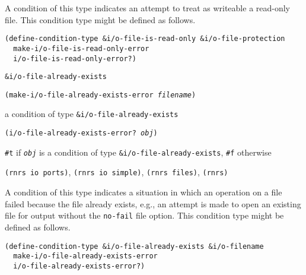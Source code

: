 A condition of this type indicates an attempt to treat as writeable a read-only file.
This condition type might be defined as follows.

\begin{alltt}
(define-condition-type \&{}i/o-file-is-read-only \&{}i/o-file-protection
  make-i/o-file-is-read-only-error
  i/o-file-is-read-only-error?)
\end{alltt}

\begin{description}

\label{exceptions_s39}\item[syntax] \texttt{\&{}i/o-file-already-exists}



\item[procedure] \texttt{(make-i/o-file-already-exists-error \textit{filename})}



\item[returns] a condition of type \texttt{\&{}i/o-file-already-exists}


\item[procedure] \texttt{(i/o-file-already-exists-error? \textit{obj})}



\item[returns] \texttt{\#{}t} if \texttt{\textit{obj}} is a condition of type \texttt{\&{}i/o-file-already-exists}, \texttt{\#{}f} otherwise


\item[libraries] \texttt{(rnrs io ports)}, \texttt{(rnrs io simple)}, \texttt{(rnrs files)}, \texttt{(rnrs)}
\end{description}



A condition of this type indicates a situation in which an operation on a file
failed because the file already exists, e.g., an attempt is made to open an
existing file for output without the \texttt{no-fail} file option.
This condition type might be defined as follows.

\begin{alltt}
(define-condition-type \&{}i/o-file-already-exists \&{}i/o-filename
  make-i/o-file-already-exists-error
  i/o-file-already-exists-error?)
\end{alltt}

